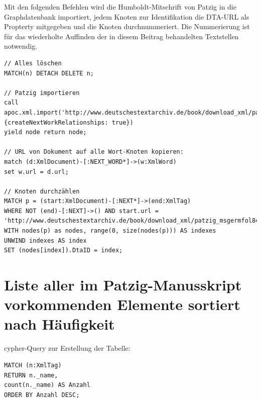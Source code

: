 \documentclass[ngerman,]{scrreprt}
\begin{document}
Mit den folgenden Befehlen wird die Humboldt-Mitschrift von Patzig in die Graphdatenbank importiert, jedem Knoten zur Identifikation die DTA-URL als Propterty mitgegeben und die Knoten durchnummeriert. Die Nummerierung ist für das wiederholte Auffinden der in diesem Beitrag behandelten Textstellen notwendig.

\begin{verbatim}
// Alles löschen
MATCH(n) DETACH DELETE n;

// Patzig importieren
call
apoc.xml.import('http://www.deutschestextarchiv.de/book/download_xml/patzig_msgermfol841842_1828',{createNextWorkRelationships: true})
yield node return node;

// URL von Dokument auf alle Wort-Knoten kopieren:
match (d:XmlDocument)-[:NEXT_WORD*]->(w:XmlWord)
set w.url = d.url;

// Knoten durchzählen
MATCH p = (start:XmlDocument)-[:NEXT*]->(end:XmlTag)
WHERE NOT (end)-[:NEXT]->() AND start.url = 'http://www.deutschestextarchiv.de/book/download_xml/patzig_msgermfol841842_1828'
WITH nodes(p) as nodes, range(0, size(nodes(p))) AS indexes
UNWIND indexes AS index
SET (nodes[index]).DtaID = index;
\end{verbatim}

\section{Liste aller im Patzig-Manusskript vorkommenden Elemente sortiert nach Häufigkeit}\label{liste-aller-im-patzig-manusskript-vorkommenden-elemente-sortiert-nach-huxe4ufigkeit}

cypher-Query zur Erstellung der Tabelle:

\begin{verbatim}
MATCH (n:XmlTag)
RETURN n._name,
count(n._name) AS Anzahl
ORDER BY Anzahl DESC;
\end{verbatim}
\end{document}

